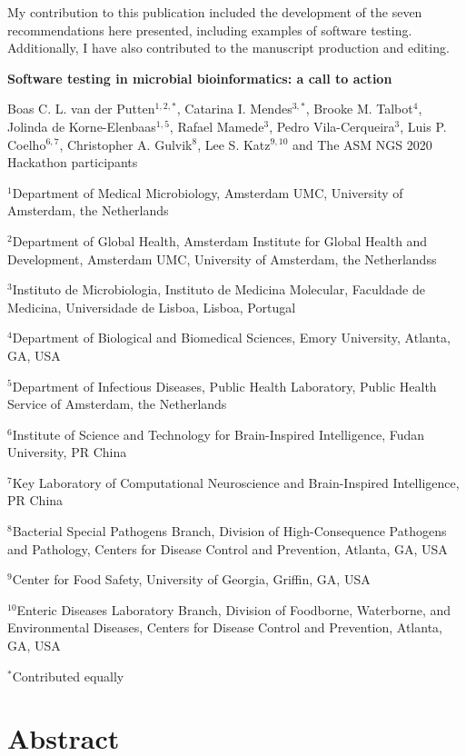 My contribution to this publication included the development of the seven recommendations here presented, including examples of software testing. Additionally, I have also contributed to the manuscript production and
editing.




\cleardoublepage 

\begin{center}
\large
\textbf{Software testing in microbial bioinformatics: a call to action}
\end{center}

Boas C. L. van der Putten$^{1,2,*}$, 
Catarina I. Mendes$^{3,*}$,
Brooke M. Talbot$^{4}$, 
Jolinda de Korne-Elenbaas$^{1,5}$, 
Rafael Mamede$^{3}$, 
Pedro Vila-Cerqueira$^{3}$, 
Luis P. Coelho$^{6,7}$, 
Christopher A. Gulvik$^{8}$, 
Lee S. Katz$^{9,10}$ and The ASM NGS 2020 Hackathon participants

$^1$Department of Medical Microbiology, Amsterdam UMC, University of Amsterdam, the Netherlands

$^2$Department of Global Health, Amsterdam Institute for Global Health and Development, Amsterdam UMC, University of Amsterdam, the Netherlandss

$^3$Instituto de Microbiologia, Instituto de Medicina Molecular, Faculdade de Medicina, Universidade de Lisboa, Lisboa, Portugal 

$^4$Department of Biological and Biomedical Sciences, Emory University, Atlanta, GA, USA

$^5$Department of Infectious Diseases, Public Health Laboratory, Public Health Service of Amsterdam, the Netherlands

$^6$Institute of Science and Technology for Brain-Inspired Intelligence, Fudan University, PR China

$^7$Key Laboratory of Computational Neuroscience and Brain-Inspired Intelligence, PR China

$^8$Bacterial Special Pathogens Branch, Division of High-Consequence Pathogens and Pathology, Centers for Disease Control and Prevention, Atlanta, GA, USA

$^9$Center for Food Safety, University of Georgia, Griffin, GA, USA

$^{10}$Enteric Diseases Laboratory Branch, Division of Foodborne, Waterborne, and Environmental Diseases, Centers for Disease Control and Prevention, Atlanta, GA, USA

$^*$Contributed equally

\section{Abstract} \label{sec:ch8_abstract}

